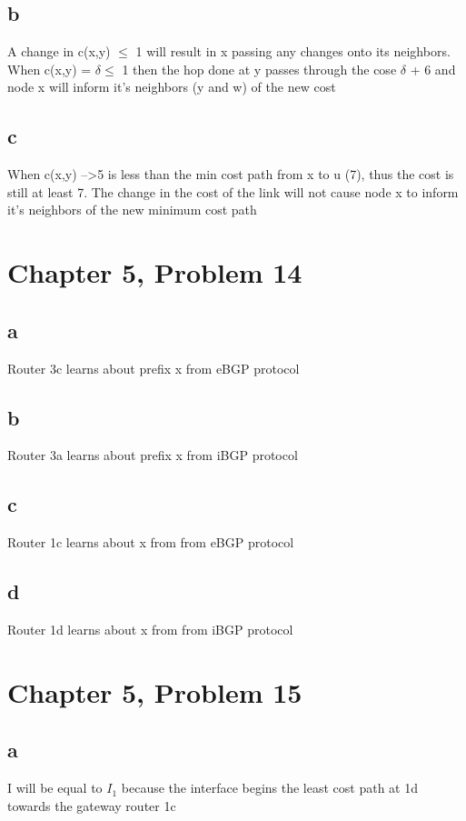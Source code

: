 \documentclass{article}
\begin{document}
\subsection*{b}
A change in c(x,y) $\leq$ 1 will result in x passing any changes onto its neighbors.\\
\newline When c(x,y) = $\delta \leq $ 1 then the hop done at y passes through the cose $\delta$ + 6 and node x will inform it's neighbors (y and w) of the new cost\\

\subsection*{c}
When c(x,y) -->5 is less than the min cost path from x to u (7), thus the cost is still at least 7.  The change in the cost of the link will not cause node x to inform it's neighbors of the new minimum cost path\\

\section*{Chapter 5, Problem 14}
\subsection*{a} Router 3c learns about prefix x from eBGP protocol\\
\subsection*{b} Router 3a learns about prefix x from iBGP protocol\\
\subsection*{c} Router 1c learns about x from from eBGP protocol\\
\subsection*{d} Router 1d learns about x from from iBGP protocol\\

\section*{Chapter 5, Problem 15}
\subsection*{a}
I will be equal to $I_1$ because the interface begins the least cost path at 1d towards the gateway router 1c\\
\end{document}
